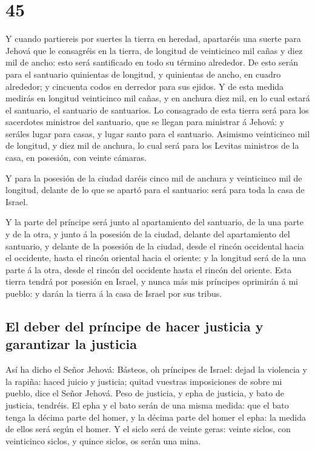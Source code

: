 \hypertarget{section-44}{%
\section{45}\label{section-44}}

 Y cuando partiereis por suertes la tierra en heredad,
apartaréis una suerte para Jehová que le consagréis en la tierra, de
longitud de veinticinco mil cañas y diez mil de ancho: esto será
santificado en todo su término alrededor.  De esto serán
para el santuario quinientas de longitud, y quinientas de ancho, en
cuadro alrededor; y cincuenta codos en derredor para sus ejidos.
 Y de esta medida medirás en longitud veinticinco mil
cañas, y en anchura diez mil, en lo cual estará el santuario, el
santuario de santuarios.  Lo consagrado de esta tierra
será para los sacerdotes ministros del santuario, que se llegan para
ministrar á Jehová: y seráles lugar para casas, y lugar santo para el
santuario.  Asimismo veinticinco mil de longitud, y diez
mil de anchura, lo cual será para los Levitas ministros de la casa, en
posesión, con veinte cámaras.

 Y para la posesión de la ciudad daréis cinco mil de
anchura y veinticinco mil de longitud, delante de lo que se apartó para
el santuario: será para toda la casa de Israel.

 Y la parte del príncipe será junto al apartamiento del
santuario, de la una parte y de la otra, y junto á la posesión de la
ciudad, delante del apartamiento del santuario, y delante de la posesión
de la ciudad, desde el rincón occidental hacia el occidente, hasta el
rincón oriental hacia el oriente: y la longitud será de la una parte á
la otra, desde el rincón del occidente hasta el rincón del oriente.
 Esta tierra tendrá por posesión en Israel, y nunca más
mis príncipes oprimirán á mi pueblo: y darán la tierra á la casa de
Israel por sus tribus.

\hypertarget{el-deber-del-pruxedncipe-de-hacer-justicia-y-garantizar-la-justicia}{%
\subsection{El deber del príncipe de hacer justicia y garantizar la
justicia}\label{el-deber-del-pruxedncipe-de-hacer-justicia-y-garantizar-la-justicia}}

 Así ha dicho el Señor Jehová: Básteos, oh príncipes de
Israel: dejad la violencia y la rapiña: haced juicio y justicia; quitad
vuestras imposiciones de sobre mi pueblo, dice el Señor Jehová.
 Peso de justicia, y epha de justicia, y bato de
justicia, tendréis.  El epha y el bato serán de una misma
medida: que el bato tenga la décima parte del homer, y la décima parte
del homer el epha: la medida de ellos será según el homer.
 Y el siclo será de veinte geras: veinte siclos, con
veinticinco siclos, y quince siclos, os serán una mina.

